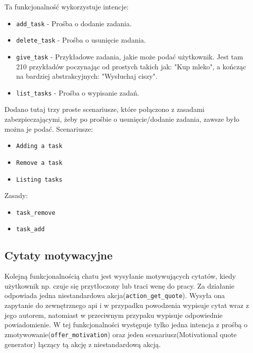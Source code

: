 \documentclass{article}
\begin{document}
Ta funkcjonalność wykorzystuje intencje:
\begin{itemize}
    \item[\textcolor{violet}{\textbullet}] \verb|add_task| - Prośba o dodanie zadania.
    \item[\textcolor{violet}{\textbullet}] \verb|delete_task| - Prośba o usunięcie zadania.
    \item[\textcolor{violet}{\textbullet}] \verb|give_task| - Przykładowe zadania, jakie może podać użytkownik.
        Jest tam 210 przykładów poczynając od prostych takich jak: "Kup mleko",
        a kończąc na bardziej abstrakcyjnych: "Wysłuchaj ciszy".
    \item[\textcolor{violet}{\textbullet}] \verb|list_tasks| - Prośba o wypisanie zadań.
\end{itemize}
Dodano tutaj trzy proste scenariusze, które połączono z zasadami
zabezpieczającymi, żeby po prośbie o usunięcie/dodanie zadania, zawsze było
można je podać.
Scenariusze:
\begin{itemize}
    \item[\textcolor{violet}{\textbullet}] \verb|Adding a task|
    \item[\textcolor{violet}{\textbullet}] \verb|Remove a task|
    \item[\textcolor{violet}{\textbullet}] \verb|Listing tasks| 
\end{itemize}
Zasady:
\begin{itemize}
    \item[\textcolor{violet}{\textbullet}] \verb|task_remove|
    \item[\textcolor{violet}{\textbullet}] \verb|task_add|
\end{itemize}


\subsection{Cytaty motywacyjne}
Kolejną funkcjonalnością chatu jest wysyłanie motywujących cytatów, kiedy
użytkownik np. czuje się przytłoczony lub traci wenę do pracy. Za działanie
odpowiada jedna niestandardowa akcja(\verb|action_get_quote|). Wysyła ona
zapytanie do zewnętrznego api i w przypadku powodzenia wypisuje cytat wraz z
jego autorem, natomiast w przeciwnym przypaku wypisuje odpowiednie
powiadomienie. W tej funkcjonalności występuje tylko jedna intencja z prośbą o
zmotywowanie(\verb|offer_motivation|) oraz jeden scenariusz(Motivational quote
generator) łączący tą akcję z niestandardową akcją.
\end{document}
